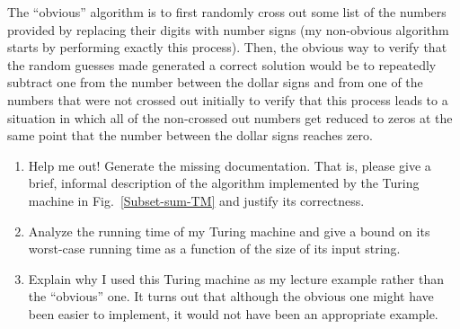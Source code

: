 	The ``obvious'' algorithm is to first randomly cross out some list of the 
	numbers provided by replacing their digits with
	number signs (my non-obvious algorithm starts by performing exactly this process). 
	Then, the obvious way to verify that the random guesses made generated a correct solution
	would be to repeatedly subtract one from the number between the dollar signs 
	and from one of the numbers that were not crossed out initially to verify that this process
	leads to a situation in which all of the non-crossed out numbers get reduced to zeros
	at the same point that the number between the dollar signs reaches zero.
	\begin{enumerate}
	\item Help me out! Generate the missing documentation. That is, please give a brief, informal
		description of the algorithm implemented by the Turing machine in Fig.~\ref{Subset-sum-TM}
		and justify its correctness.
	\item Analyze the running time of my Turing machine and give a bound on its worst-case running time
		as a function of the size of its input string.
	\item Explain why I used this Turing machine as my lecture example rather than the ``obvious'' one.
		It turns out that although the obvious one might have been easier to implement, it would
		not have been an appropriate example.
	\end{enumerate}


